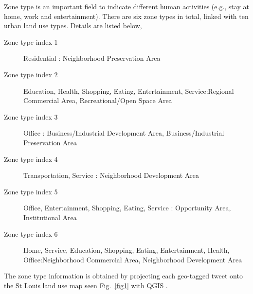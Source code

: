 \documentclass{article}
\begin{document}
Zone type is an important field to indicate different human activities (e.g., stay at home, work and entertainment). There are six zone types in total, linked with ten urban land use types. Details are listed below,

\begin{description}
\item[Zone type index 1]  Residential	: Neighborhood Preservation Area	
\item[Zone type index 2] Education, Health, Shopping, Eating, Entertainment, Service:Regional Commercial Area, Recreational/Open Space Area
\item[Zone type index 3] Office : Business/Industrial Development Area, Business/Industrial Preservation Area
\item[Zone type index 4] Transportation, Service : Neighborhood Development Area
\item[Zone type index 5] Office, Entertainment, Shopping, Eating, Service : Opportunity Area, Institutional Area
\item[Zone type index 6] Home, Service, Education, Shopping, Eating, Entertainment, Health, Office:Neighborhood Commercial Area, Neighborhood Development Area
\end{description}





The zone type information is obtained by projecting each geo-tagged tweet onto the St Louis land use map seen Fig.~\ref{fig1} with QGIS \cite{qgis2015qgis}. 
\end{document}
